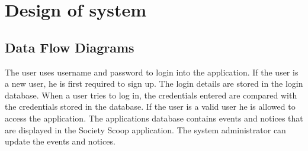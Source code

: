 \chapter{Design of system}
\newpage

\section{Data Flow Diagrams}



       \vspace{0.2cm}The user uses username and password to login into the application. If the user is a new user, he is first required to sign up. The login details are stored in the login database. When a user tries to log in, the credentials entered are compared with the credentials stored in the database. If the user is a valid user he is allowed to access the application.
The applications database contains events and notices that are displayed in the Society Scoop application. The system administrator can update the events and notices.



